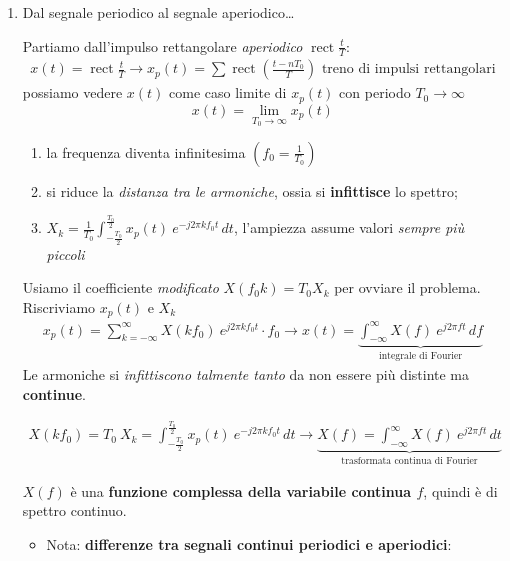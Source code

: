 \documentclass[
  paper=a4,
  ,captions=tableheading
]{scrartcl}
\providecommand{\tightlist}{%
  \setlength{\itemsep}{0pt}\setlength{\parskip}{0pt}}
\begin{document}
\begin{enumerate}
\def\labelenumi{\arabic{enumi}.}
\setcounter{enumi}{8}
\item
  Dal segnale periodico al segnale aperiodico\ldots{}

  Partiamo dall'impulso rettangolare \emph{aperiodico}
  \(\mathop{\mathrm{rect}}{\frac{t}{T}}\): \begin{gather*}
   x(t) = \mathop{\mathrm{rect}}{\frac{t}{T}} \to x_{p}(t) = \sum \mathop{\mathrm{rect}}(\frac{t-nT_0}{T}) \text{ treno di impulsi rettangolari}
   \end{gather*} possiamo vedere \(x(t)\) come caso limite di \(x_p(t)\)
  con periodo \(T_0 \to \infty\) \[
   x(t) = \lim_{T_0 \to \infty} x_{p}(t)
   \]

  \begin{enumerate}
  \def\labelenumii{\arabic{enumii}.}
  \tightlist
  \item
    la frequenza diventa infinitesima \((f_0 = \frac{1}{T_0})\)
  \item
    si riduce la \emph{distanza tra le armoniche}, ossia si
    \textbf{infittisce} lo spettro;
  \item
    \(X_k=\frac{1}{T_0}\int_{-\frac{T_0}{2}}^{\frac{T_0}{2}} x_p(t) \ e^{-j2\pi kf_0 t}\,dt\),
    l'ampiezza assume valori \emph{sempre più piccoli}
  \end{enumerate}

  Usiamo il coefficiente \emph{modificato} \(X(f_0 k) = T_0 X_k\) per
  ovviare il problema. Riscriviamo \(x_p(t)\) e \(X_k\)\\
  \begin{gather*}
   x_{p}(t) = \sum_{k=-\infty}^{\infty}X(kf_0)\ e^{j2\pi kf_0 t} \cdot f_0 \to x(t) = \underbrace{\int_{-\infty}^{\infty}X(f)\ e^{j2\pi ft}\,df}_{\text{integrale di Fourier}}
   \end{gather*} Le armoniche si \emph{infittiscono talmente tanto} da
  non essere più distinte ma \textbf{continue}.

  \begin{gather*}
   X(kf_0) = T_0 \ X_k = \int_{-\frac{T_0}{2}}^{\frac{T_0}{2}}  x_{p}(t) \ e^{-j2\pi kf_0 t}\,dt \to \underbrace{X(f) = \int_{-\infty}^{\infty}X(f)\ e^{j2\pi ft}\,dt}_{\text{trasformata continua di Fourier}}
   \end{gather*}

  \(X(f)\) è una \textbf{funzione complessa della variabile continua
  \(f\)}, quindi è di spettro continuo.

  \begin{itemize}
  \tightlist
  \item
    Nota: \textbf{differenze tra segnali continui periodici e
    aperiodici}:


\end{itemize}
\end{enumerate}
\end{document}
